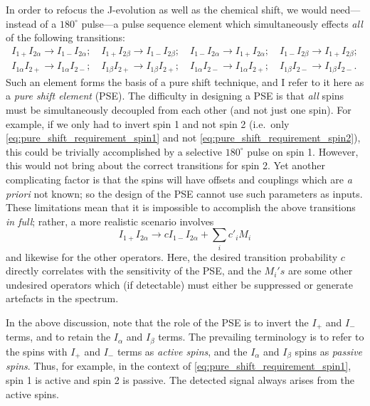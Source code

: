 In order to refocus the J-evolution as well as the chemical shift, we would need---instead of a $180^\circ$ pulse---a pulse sequence element which simultaneously effects \textit{all} of the following transitions:
\begin{align}
    I_{1+}I_{2\alpha} \longrightarrow I_{1-}I_{2\alpha}; \quad I_{1+}I_{2\beta} \longrightarrow I_{1-}I_{2\beta}; \quad
    I_{1-}I_{2\alpha} \longrightarrow I_{1+}I_{2\alpha}; \quad I_{1-}I_{2\beta} \longrightarrow I_{1+}I_{2\beta}; \label{eq:pure_shift_requirement_spin1} \\
    I_{1\alpha}I_{2+} \longrightarrow I_{1\alpha}I_{2-}; \quad I_{1\beta}I_{2+} \longrightarrow I_{1\beta}I_{2+}; \quad
    I_{1\alpha}I_{2-} \longrightarrow I_{1\alpha}I_{2+}; \quad I_{1\beta}I_{2-} \longrightarrow I_{1\beta}I_{2-}. \label{eq:pure_shift_requirement_spin2}
\end{align}
Such an element forms the basis of a pure shift technique, and I refer to it here as a \textit{pure shift element} (PSE).
The difficulty in designing a PSE is that \textit{all} spins must be simultaneously decoupled from each other (and not just one spin).
For example, if we only had to invert spin 1 and not spin 2 (i.e.\ only \cref{eq:pure_shift_requirement_spin1} and not \cref{eq:pure_shift_requirement_spin2}), this could be trivially accomplished by a selective $180^\circ$ pulse on spin 1.
However, this would not bring about the correct transitions for spin 2.
Yet another complicating factor is that the spins will have offsets and couplings which are \textit{a priori} not known; so the design of the PSE cannot use such parameters as inputs.
These limitations mean that it is impossible to accomplish the above transitions \textit{in full}; rather, a more realistic scenario involves
\begin{equation}
    \label{eq:realistic_pse}
    I_{1+}I_{2\alpha} \longrightarrow c I_{1-}I_{2\alpha} + \sum_i c'_i M_i
\end{equation}
and likewise for the other operators.
Here, the desired transition probability $c$ directly correlates with the sensitivity of the PSE, and the $M_i's$ are some other undesired operators which (if detectable) must either be suppressed or generate artefacts in the spectrum.

In the above discussion, note that the role of the PSE is to invert the $I_+$ and $I_-$ terms, and to retain the $I_\alpha$ and $I_\beta$ terms.
The prevailing terminology is to refer to the spins with $I_+$ and $I_-$ terms as \textit{active spins}, and the $I_\alpha$ and $I_\beta$ spins as \textit{passive spins}.
Thus, for example, in the context of \cref{eq:pure_shift_requirement_spin1}, spin 1 is active and spin 2 is passive.
The detected signal always arises from the active spins.

